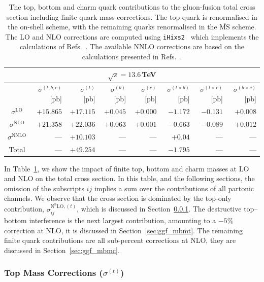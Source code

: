 \begin{table}[h!]
\centering \small
\begin{tabular}{|c|rrrrrrr|}
\hline
\multicolumn{8}{|c|}{$\sqrt{s}=13.6$\,TeV} \\ \hline
& $\sigma^{(t,b,c)}$ [pb] & $\sigma^{(t)}$ [pb] & $\sigma^{(b)}$ [pb] & $\sigma^{(c)}$ [pb] & $\sigma^{(t \times b)}$ [pb] & $\sigma^{(t \times c)}$ [pb] & $\sigma^{(b \times c)}$ [pb] \\ \hline
$\sigma^\mathrm{LO}$  & $+15.865$ & $+17.115$ & $+0.045$ & $+0.000$ & $-1.172$ & $-0.131$ & $+0.008$ \\
$\sigma^\mathrm{NLO}$  & $+21.358$ & $+22.036$ & $+0.063$ & $+0.001$ & $-0.663$ & $-0.089$ & $+0.012$ \\
$\sigma^\mathrm{NNLO}$ & --- & $+10.103$ & --- & --- & $+0.04$ & --- & --- \\
\hline
Total & --- & $+49.254$ & --- & --- & $-1.795$ & --- & --- \\
\hline
\end{tabular}
\caption{The top, bottom and charm quark contributions to the gluon-fusion total cross section including finite quark mass corrections.
The top-quark is renormalised in the on-shell scheme, with the remaining quarks renormalised in the $\overline{\mathrm{MS}}$ scheme.
The LO and NLO corrections are computed using \texttt{iHixs2}~\cite{Dulat:2018rbf} which implements the calculations of Refs.~\cite{Graudenz:1992pv,Spira:1995rr}.
The available NNLO corrections are based on the calculations presented in Refs.~\cite{Czakon:2020vql,Czakon:2021yub,Czakon:2023kqm,Czakon:2024ywb}.
}
\label{tab:ggf_tbc}
\end{table}

In Table~\ref{tab:ggf_tbc}, we show the impact of finite top, bottom and charm masses at LO and NLO on the total cross section.
In this table, and the following sections, the omission of the subscripts $ij$ implies a sum over the contributions of all partonic channels.
We observe that the cross section is dominated by the top-only contribution, $\sigma_{ij}^{\mathrm{N^nLO}, (t)}$, which is discussed in  Section~\ref{sec:ggf_mt}.
The destructive top--bottom interference is the next largest contribution, amounting to a $-5\%$ correction at NLO, it is discussed in Section~\ref{sec:ggf_mbmt}.
The remaining finite quark contributions are all sub-percent corrections at NLO, they are discussed in Section~\ref{sec:ggf_mbmc}.

\subsubsection{Top Mass Corrections ($\sigma^{(t)}$)}
\label{sec:ggf_mt}

